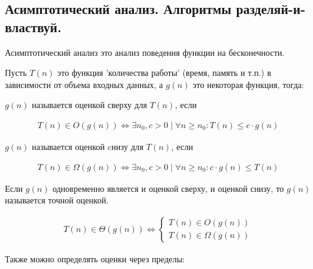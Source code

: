 \subsection{%
  Асимптотический анализ. Алгоритмы разделяй-и-властвуй.%
}

Асимптотический анализ это анализ поведения функции на бесконечности.

Пусть \(T(n)\) это функция 'количества работы' (время, память и т.п.) в
зависимости от объема входных данных, а \(g(n)\) это некоторая функция, тогда:

\begin{definition}
  \(g(n)\) называется оценкой сверху для \(T(n)\), если

  \begin{align*}
    T(n) \in O(g(n)) \iff
      \exists n_{0}, c > 0 \mid \forall n \ge n_{0} \colon T(n) \le c \cdot g(n)
  \end{align*}
\end{definition}

\begin{definition}
  \(g(n)\) называется оценкой cнизу для \(T(n)\), если
  
  \begin{align*}
    T(n) \in \Omega(g(n)) \iff
      \exists n_{0}, c > 0 \mid \forall n \ge n_{0} \colon c \cdot g(n) \le T(n)
  \end{align*}
\end{definition}

\begin{definition}
  Если \(g(n)\) одновременно является и оценкой сверху, и оценкой снизу, то
  \(g(n)\) называется точной оценкой.

  \begin{align*}
    T(n) \in \Theta(g(n)) \iff \begin{cases}
      T(n) \in O(g(n)) \\
      T(n) \in \Omega(g(n))
    \end{cases}
  \end{align*}
\end{definition}

Также можно определять оценки через пределы:

